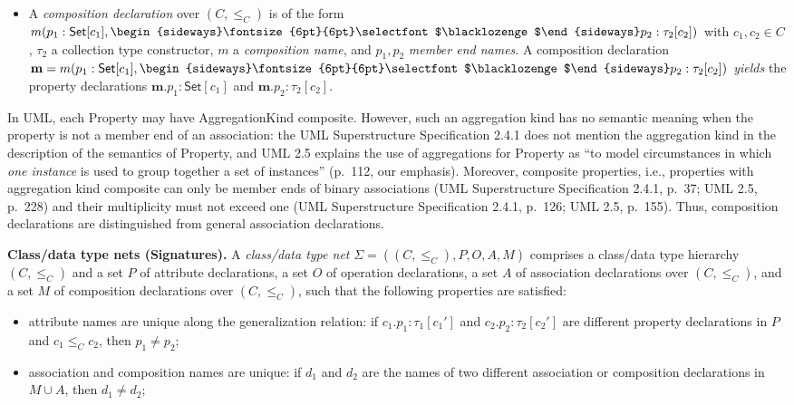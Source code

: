 \documentclass[10pt,fleqn,final]{scrreprt}
\newenvironment{definitions}[0]{\medskip }{}
\newcommand{\uml}[1]{\textsf{#1}}
\newcommand{\composition}{\raisebox{0.2pt}{\begin{sideways}\fontsize{6pt}{6pt}\selectfont$\blacklozenge$\end{sideways}}}
\begin{document}
\begin{definitions}
\begin{itemize}[label={--}, leftmargin=*]
  \item A \emph{composition declaration} over $(C, {\leq_C})$ is of the
form $m(p_1 : \mathsf{Set}[c_1], \composition p_2 : \tau_2[c_2])$ with
$c_1, c_2 \in C$, $\tau_2$ a collection type constructor, $m$ a
\emph{composition name}, and $p_1, p_2$ \emph{member end
  names}. A
composition declaration
$\mathbf{m} = m(p_1 : \mathsf{Set}[c_1], \composition p_2 :
\tau_2[c_2])$
\emph{yields} the property declarations
$\mathbf{m}.p_1 : \mathsf{Set}[c_1]$ and $\mathbf{m}.p_2 : \tau_2[c_2]$.
\end{itemize}
{In UML, each \uml{Property} may have
  \uml{AggregationKind} \uml{composite}.  However, such an aggregation
  kind has no semantic meaning when the property is not a member end of
  an association: the UML Superstructure Specification 2.4.1 does not
  mention the aggregation kind in the description of the semantics of
  \uml{Property}, and UML 2.5 explains the use of aggregations for
  \uml{Property} as ``to model circumstances in which \emph{one
    instance} is used to group together a set of instances'' (p.~112,
  our emphasis).  Moreover, composite properties, i.e., properties with
  aggregation kind \uml{composite} can only be member ends of binary
  associations (UML Superstructure Specification 2.4.1, p.~37; UML 2.5,
  p.~228) and their multiplicity must not exceed one (UML Superstructure
  Specification 2.4.1, p.~126; UML 2.5, p.~155).  Thus, 
  composition declarations are  distinguished from general association declarations.}


\medskip\noindent\textbf{Class/data type nets (Signatures).}
A \emph{class/data type net} $\Sigma = ((C, {\leq_C}), P, O, A, M)$
comprises a class/data type hierarchy $(C, {\leq_C})$ and a set $P$ of
attribute declarations, a set $O$ of operation declarations,
 a set $A$ of association declarations over
$(C, {\leq_C})$, and a set $M$ of composition declarations over $(C, {\leq_C})$, such that
the following properties are satisfied:
%
\begin{itemize}[label={--}, leftmargin=*]
  \item attribute names are unique along the generalization relation: if
$c_1.p_1 : \tau_1[c_1']$ and $c_2.p_2 : \tau_2[c_2']$ are different
property declarations in $P$ and $c_1 \leq_C c_2$, then $p_1 \neq
p_2$;

  \item association and composition names are unique: if $d_1$ and
$d_2$ are the names of two different association or composition
declarations in $M \cup A$, then $d_1 \neq d_2$;


\end{itemize}
\end{definitions}
\end{document}
